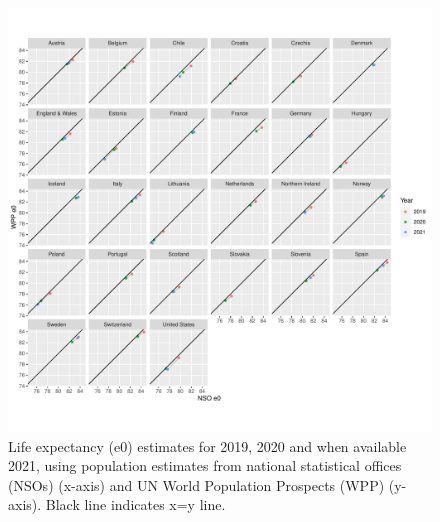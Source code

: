 \documentclass[12pt]{article}
\begin{document}
\begin{figure}[ht!]
    \centering
    \includegraphics[width=\textwidth]{figure-s1.pdf}
    \caption{Life expectancy (e0) estimates for 2019, 2020 and when available 2021, using population estimates from national statistical offices (NSOs) (x-axis) and UN World Population Prospects (WPP) (y-axis). Black line indicates x=y line.}
    \label{fig:figure-a8}
\end{figure}
\end{document}
